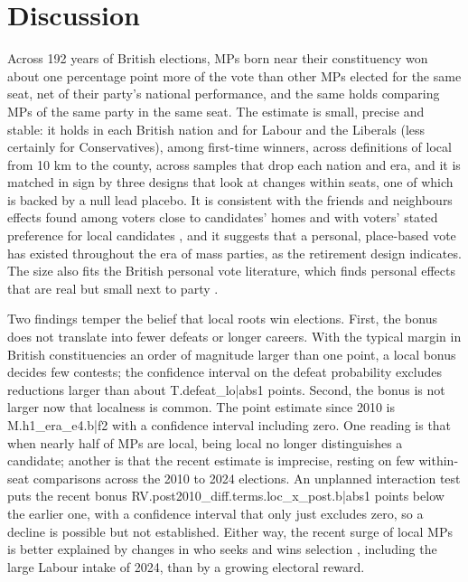 \documentclass[11pt,a4paper]{article}
\begin{document}
\section{Discussion}
Across 192 years of British elections, MPs born near their constituency won about one percentage point more of the vote than other MPs elected for the same seat, net of their party's national performance, and the same holds comparing MPs of the same party in the same seat. The estimate is small, precise and stable: it holds in each British nation and for Labour and the Liberals (less certainly for Conservatives), among first-time winners, across definitions of local from 10 km to the county, across samples that drop each nation and era, and it is matched in sign by three designs that look at changes within seats, one of which is backed by a null lead placebo. It is consistent with the friends and neighbours effects found among voters close to candidates' homes \citep{arzheimerevans2012,evans2017} and with voters' stated preference for local candidates \citep{campbellcowley2014,campbell2019}, and it suggests that a personal, place-based vote has existed throughout the era of mass parties, as the retirement design indicates. The size also fits the British personal vote literature, which finds personal effects that are real but small next to party \citep{cain1987,gaines1998,eggersspirling2017}.

Two findings temper the belief that local roots win elections. First, the bonus does not translate into fewer defeats or longer careers. With the typical margin in British constituencies an order of magnitude larger than one point, a local bonus decides few contests; the confidence interval on the defeat probability excludes reductions larger than about {{T.defeat_lo|abs1}} points. Second, the bonus is not larger now that localness is common. The point estimate since 2010 is {{M.h1_era_e4.b|f2}} with a confidence interval including zero. One reading is that when nearly half of MPs are local, being local no longer distinguishes a candidate; another is that the recent estimate is imprecise, resting on few within-seat comparisons across the 2010 to 2024 elections. An unplanned interaction test puts the recent bonus {{RV.post2010_diff.terms.loc_x_post.b|abs1}} points below the earlier one, with a confidence interval that only just excludes zero, so a decline is possible but not established. Either way, the recent surge of local MPs is better explained by changes in who seeks and wins selection \citep{norrislovenduski1995}, including the large Labour intake of 2024, than by a growing electoral reward.
\end{document}
